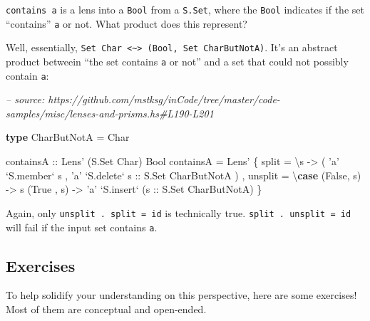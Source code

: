 \documentclass[]{article}
\newenvironment{Shaded}{}{}
\newcommand{\CharTok}[1]{\textcolor[rgb]{0.25,0.44,0.63}{#1}}
\newcommand{\CommentTok}[1]{\textcolor[rgb]{0.38,0.63,0.69}{\textit{#1}}}
\newcommand{\DataTypeTok}[1]{\textcolor[rgb]{0.56,0.13,0.00}{#1}}
\newcommand{\FunctionTok}[1]{\textcolor[rgb]{0.02,0.16,0.49}{#1}}
\newcommand{\KeywordTok}[1]{\textcolor[rgb]{0.00,0.44,0.13}{\textbf{#1}}}
\newcommand{\NormalTok}[1]{#1}
\newcommand{\OtherTok}[1]{\textcolor[rgb]{0.00,0.44,0.13}{#1}}
\begin{document}
\texttt{contains\ \textquotesingle{}a\textquotesingle{}} is a lens into a
\texttt{Bool} from a \texttt{S.Set}, where the \texttt{Bool} indicates if the
set ``contains'' \texttt{a} or not. What product does this represent?

Well, essentially,
\texttt{Set\ Char\ \textless{}\textasciitilde{}\textgreater{}\ (Bool,\ Set\ CharButNotA)}.
It's an abstract product betweein ``the set contains
\texttt{\textquotesingle{}a\textquotesingle{}} or not'' and a set that could not
possibly contain \texttt{\textquotesingle{}a\textquotesingle{}}:

\begin{Shaded}
\begin{Highlighting}[]
\CommentTok{-- source: https://github.com/mstksg/inCode/tree/master/code-samples/misc/lenses-and-prisms.hs#L190-L201}

\KeywordTok{type} \DataTypeTok{CharButNotA} \FunctionTok{=} \DataTypeTok{Char}

\OtherTok{containsA ::} \DataTypeTok{Lens'}\NormalTok{ (}\DataTypeTok{S.Set} \DataTypeTok{Char}\NormalTok{) }\DataTypeTok{Bool}
\NormalTok{containsA }\FunctionTok{=} \DataTypeTok{Lens'}
\NormalTok{    \{ split   }\FunctionTok{=}\NormalTok{ \textbackslash{}s }\OtherTok{->}
\NormalTok{        ( }\CharTok{'a'} \OtherTok{`S.member`}\NormalTok{ s}
\NormalTok{        , }\CharTok{'a'} \OtherTok{`S.delete` s      ::} \DataTypeTok{S.Set} \DataTypeTok{CharButNotA}
\NormalTok{        )}
\NormalTok{    , unsplit }\FunctionTok{=}\NormalTok{ \textbackslash{}}\KeywordTok{case}
\NormalTok{        (}\DataTypeTok{False}\NormalTok{, s) }\OtherTok{->}\NormalTok{ s}
\NormalTok{        (}\DataTypeTok{True}\NormalTok{ , s) }\OtherTok{->} \CharTok{'a'} \OtherTok{`S.insert`}\NormalTok{ (}\OtherTok{s ::} \DataTypeTok{S.Set} \DataTypeTok{CharButNotA}\NormalTok{)}
\NormalTok{    \}}
\end{Highlighting}
\end{Shaded}

Again, only \texttt{unsplit\ .\ split\ =\ id} is technically true.
\texttt{split\ .\ unsplit\ =\ id} will fail if the input set contains
\texttt{\textquotesingle{}a\textquotesingle{}}.

\hypertarget{exercises}{%
\subsection{Exercises}\label{exercises}}

To help solidify your understanding on this perspective, here are some
exercises! Most of them are conceptual and open-ended.
\end{document}
